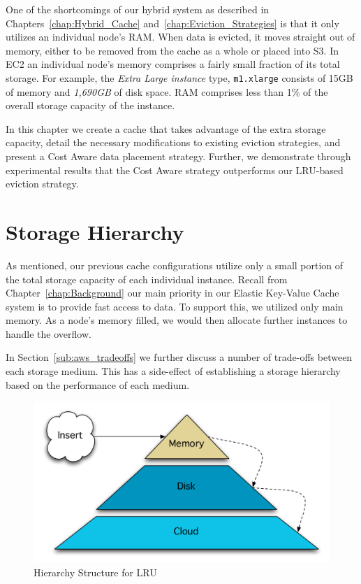 One of the shortcomings of our hybrid system as described in
Chapters~\ref{chap:Hybrid_Cache} and~\ref{chap:Eviction_Strategies} is that it
only utilizes an individual node's RAM\@. When data is evicted, it moves
straight out of memory, either to be removed from the cache as a whole or
placed into S3. In EC2 an individual node's memory comprises a fairly small
fraction of its total storage. For example, the \emph{Extra Large instance}
type, {\tt m1.xlarge} consists of 15GB of memory and \emph{1,690GB} of disk
space.  RAM comprises less than 1\% of the overall storage capacity of the
instance.

In this chapter we create a cache that takes advantage of the extra storage
capacity, detail the necessary modifications to existing eviction strategies,
and present a Cost Aware data placement strategy. Further, we demonstrate
through experimental results that the Cost Aware strategy outperforms our
LRU-based eviction strategy.

\section{Storage Hierarchy} %
\label{sec:storage_hierarchy}
As mentioned, our previous cache configurations utilize only a small portion of
the total storage capacity of each individual instance. Recall from
Chapter~\ref{chap:Background} our main priority in our Elastic Key-Value Cache
system is to provide fast access to data. To support this, we utilized only
main memory. As a node's memory filled, we would then allocate further
instances to handle the overflow.

In Section~\ref{sub:aws_tradeoffs} we further discuss a number of trade-offs
between each storage medium. This has a side-effect of establishing a storage
hierarchy based on the performance of each medium.

\begin{figure}
\begin{center}
\includegraphics[scale=0.5]{figures/hierarchy-lru.pdf}
\end{center}
\caption{Hierarchy Structure for LRU}
\label{fig:hierarchy_lru}
\end{figure}

